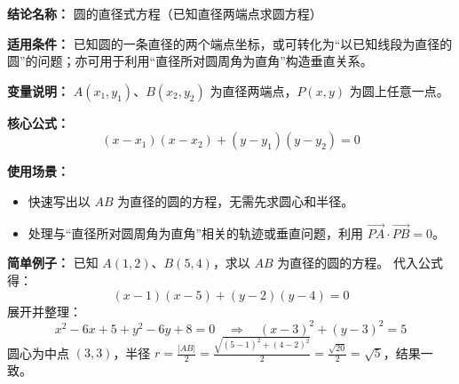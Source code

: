 \textbf{结论名称：} 圆的直径式方程（已知直径两端点求圆方程）

\textbf{适用条件：} 已知圆的一条直径的两个端点坐标，或可转化为“以已知线段为直径的圆”的问题；亦可用于利用“直径所对圆周角为直角”构造垂直关系。

\textbf{变量说明：} $A(x_1,y_1)$、$B(x_2,y_2)$ 为直径两端点，$P(x,y)$ 为圆上任意一点。

\textbf{核心公式：} 
\[
\boxed{(x-x_1)(x-x_2)+(y-y_1)(y-y_2)=0}
\]

\textbf{使用场景：} 
\begin{itemize}
  \item 快速写出以 $AB$ 为直径的圆的方程，无需先求圆心和半径。
  \item 处理与“直径所对圆周角为直角”相关的轨迹或垂直问题，利用 $\overrightarrow{PA}\cdot\overrightarrow{PB}=0$。
\end{itemize}

\textbf{简单例子：} 
已知 $A(1,2)$、$B(5,4)$，求以 $AB$ 为直径的圆的方程。
代入公式得：
\[
(x-1)(x-5)+(y-2)(y-4)=0
\]
展开并整理：
\[
x^2-6x+5 + y^2-6y+8=0 \quad\Longrightarrow\quad (x-3)^2+(y-3)^2=5
\]
圆心为中点 $(3,3)$，半径 $r=\frac{|AB|}{2}=\frac{\sqrt{(5-1)^2+(4-2)^2}}{2}=\frac{\sqrt{20}}{2}=\sqrt{5}$，结果一致。